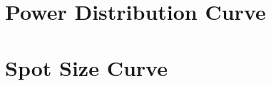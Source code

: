 \thispagestyle{empty}
 


\section{Power Distribution Curve}
\label{app:powwer_distribution}



\section{Spot Size Curve}
\label{app:spot_size}


